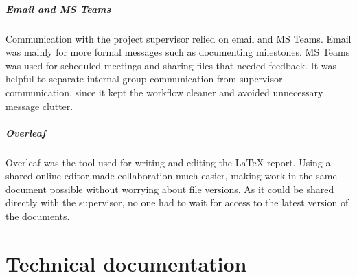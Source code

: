 \documentclass[english]{aghengthesis} %
\begin{document}
\paragraph{Email and MS Teams}
Communication with the project supervisor relied on email and MS Teams. Email was mainly for more formal messages such as documenting milestones. MS Teams was used for scheduled meetings and sharing files that needed feedback. It was helpful to separate internal group communication from supervisor communication, since it kept the workflow cleaner and avoided unnecessary message clutter.

\paragraph{Overleaf}
Overleaf was the tool used for writing and editing the \LaTeX{} report. Using a shared online editor made collaboration much easier, making work in the same document possible without worrying about file versions. As it could be shared directly with the supervisor, no one had to wait for access to the latest version of the documents.






  
\chapter{Technical documentation}
\label{chap:technical-documentation}
\end{document}

